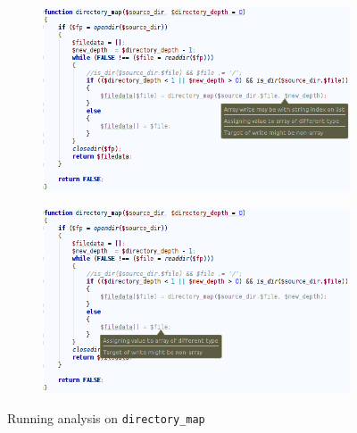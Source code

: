 \begin{figure}
\centering
\begin{subfigure}{\textwidth}
\centering
\includegraphics[width=\textwidth]{chapters/caseStudy/newScreens/dirmap1}
\label{fig:directoryScreenshot1}

\end{subfigure}
\begin{subfigure}{\textwidth}
\centering
\includegraphics[width=\textwidth]{chapters/caseStudy/newScreens/dirmap2}
\label{fig:directoryScreenshot2}

\end{subfigure}
\caption{Running analysis on \texttt{directory\_map} }
\label{fig:directoryScreenshot}
\end{figure}


